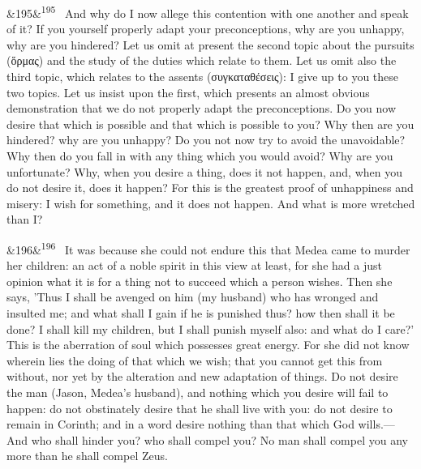 \documentclass[12pt]{article}
\newcommand{\para}[1][]{\par\noindent\ifx&#1&\else\textsuperscript{\footnotesize #1}~\fi}
\begin{document}
\para[195] And why do I now allege this contention with one another and speak of it? If you yourself properly adapt your preconceptions, why are you unhappy, why are you hindered? Let us omit at present the second topic about the pursuits (ὅρμας) and the study of the duties which relate to them. Let us omit also the third topic, which relates to the assents (συγκαταθέσεις): I give up to you these two topics. Let us insist upon the first, which presents an almost obvious demonstration that we do not properly adapt the preconceptions. Do you now desire that which is possible and that which is possible to you? Why then are you hindered? why are you unhappy? Do you not now try to avoid the unavoidable? Why then do you fall in with any thing which you would avoid? Why are you unfortunate? Why, when you desire a thing, does it not happen, and, when you do not desire it, does it happen? For this is the greatest proof of unhappiness and misery: I wish for something, and it does not happen. And what is more wretched than I?

\para[196] It was because she could not endure this that Medea came to murder her children: an act of a noble spirit in this view at least, for she had a just opinion what it is for a thing not to succeed which a person wishes. Then she says, 'Thus I shall be avenged on him (my husband) who has wronged and insulted me; and what shall I gain if he is punished thus? how then shall it be done? I shall kill my children, but I shall punish myself also: and what do I care?' This is the aberration of soul which possesses great energy. For she did not know wherein lies the doing of that which we wish; that you cannot get this from without, nor yet by the alteration and new adaptation of things. Do not desire the man (Jason, Medea's husband), and nothing which you desire will fail to happen: do not obstinately desire that he shall live with you: do not desire to remain in Corinth; and in a word desire nothing than that which God wills.—And who shall hinder you? who shall compel you? No man shall compel you any more than he shall compel Zeus.
\end{document}

